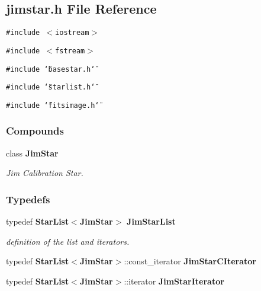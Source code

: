 \subsection{jimstar.h File Reference}
\label{jimstar_h}
{\tt \#include $<$iostream$>$}\par
{\tt \#include $<$fstream$>$}\par
{\tt \#include \char`\"{}basestar.h\char`\"{}}\par
{\tt \#include \char`\"{}starlist.h\char`\"{}}\par
{\tt \#include \char`\"{}fitsimage.h\char`\"{}}\par
\subsubsection*{Compounds}
\begin{CompactItemize}
\item 
class {\bf Jim\-Star}
\begin{CompactList}\small\item\em Jim Calibration Star.\item\end{CompactList}\end{CompactItemize}
\subsubsection*{Typedefs}
\begin{CompactItemize}
\item 
{}
typedef {\bf Star\-List}$<${\bf Jim\-Star}$>$ {\bf Jim\-Star\-List}\label{jimstar_h_a0}

\begin{CompactList}\small\item\em definition of the list and iterators.\item\end{CompactList}\item 
{}
typedef {\bf Star\-List}$<${\bf Jim\-Star}$>$::const\_\-iterator {\bf Jim\-Star\-CIterator}\label{jimstar_h_a1}

\item 
{}
typedef {\bf Star\-List}$<${\bf Jim\-Star}$>$::iterator {\bf Jim\-Star\-Iterator}\label{jimstar_h_a2}

\end{CompactItemize}
